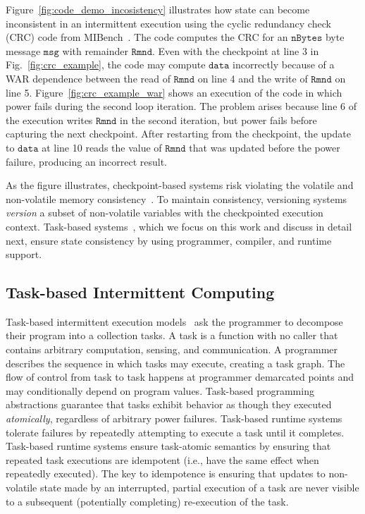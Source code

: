 Figure~\ref{fig:code_demo_incosistency} illustrates how state can become inconsistent in an intermittent execution using the cyclic redundancy check (CRC) code from MIBench~\cite{hicks_mibench2_2016}. The code computes the CRC for an $\texttt{nBytes}$ byte message $\texttt{msg}$ with remainder $\texttt{Rmnd}$. Even with the checkpoint at line 3 in Fig.~\ref{fig:crc_example}, the code may compute  $\texttt{data}$ incorrectly because of a WAR dependence between the read of $\texttt{Rmnd}$ on line 4 and the write of $\texttt{Rmnd}$ on line 5. Figure~\ref{fig:crc_example_war} shows an execution of the code in which power fails during the second loop iteration. The problem arises because line 6 of the execution writes $\texttt{Rmnd}$ in the second iteration, but power fails before capturing the next checkpoint. After restarting from the checkpoint, the update to $\texttt{data}$ at line 10 reads the value of $\texttt{Rmnd}$ that was updated before the power failure, producing an incorrect result.

As the figure illustrates, checkpoint-based systems risk violating the volatile and non-volatile memory consistency~\cite{dino}. To maintain consistency, versioning systems~\cite{dino,ratchet} {\em version} a subset of non-volatile variables with the checkpointed execution context. Task-based systems~\cite{chain,alpaca}, which we focus on this work and discuss in detail next, ensure state consistency by using programmer, compiler, and runtime support.

\subsection{Task-based Intermittent Computing}
\label{section:background_task_computing}

Task-based intermittent execution models~\cite{dino,chain,alpaca} ask the programmer to decompose their program into a collection tasks. A task is a function with no caller that contains arbitrary computation, sensing, and communication. A programmer describes the sequence in which tasks may execute, creating a task graph. The flow of control from task to task happens at programmer demarcated points and may conditionally depend on program values. Task-based programming abstractions guarantee that tasks exhibit behavior as though they executed {\em atomically}, regardless of arbitrary power failures. Task-based runtime systems tolerate failures by repeatedly attempting to execute a task until it completes. Task-based runtime systems ensure task-atomic semantics by ensuring that repeated task executions are idempotent (i.e., have the same effect when repeatedly executed). The key to idempotence is ensuring that updates to non-volatile state made by an interrupted, partial execution of a task are never visible to a subsequent (potentially completing) re-execution of the task.  

